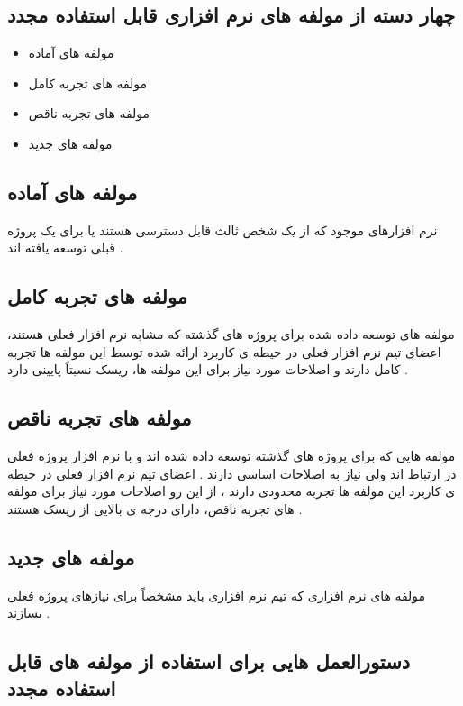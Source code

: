 \documentclass{article}
\begin{document}
\subsection{چهار دسته از مولفه های نرم افزاری قابل استفاده مجدد}


\begin{itemize}
	\item مولفه های آماده
	\item مولفه های تجربه کامل
	\item مولفه های تجربه ناقص
	\item مولفه های جدید
\end{itemize}




\subsection{مولفه های آماده}
نرم افزارهای موجود که از یک شخص ثالث قابل دسترسی هستند یا برای یک پروژه قبلی توسعه یافته اند .


\subsection{مولفه های تجربه کامل}

مولفه های توسعه داده شده برای پروژه های گذشته که مشابه نرم افزار فعلی هستند، اعضای تیم نرم افزار فعلی در حیطه ی کاربرد ارائه شده توسط این مولفه ها تجربه کامل دارند و اصلاحات مورد نیاز برای این مولفه ها، ریسک نسبتاً پایینی دارد .



\subsection{مولفه های تجربه ناقص}

مولفه هایی که برای پروژه های گذشته توسعه داده شده اند و با نرم افزار پروژه فعلی در ارتباط اند ولی نیاز به اصلاحات اساسی دارند . اعضای تیم نرم افزار فعلی در حیطه ی کاربرد این مولفه ها تجربه محدودی دارند ، از این رو اصلاحات مورد نیاز برای مولفه های تجربه ناقص، دارای درجه ی بالایی از ریسک هستند .


\subsection{مولفه های جدید}
مولفه های نرم افزاری که تیم نرم افزاری باید مشخصاً برای نیازهای پروژه فعلی بسازند .



\subsection{دستورالعمل هایی برای استفاده از مولفه های قابل استفاده مجدد}
\end{document}
